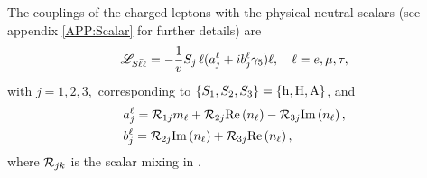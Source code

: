 \documentclass[12pt,a4paper]{article}
\begin{document}
The couplings of the charged leptons with the physical neutral scalars (see appendix \ref{APP:Scalar} for further details) are
\begin{equation}\label{eq:Sll:couplings:00}
 \mathscr L_{S\bar{\ell}\ell}=-\frac{1}{v_{}}S_j\,\bar \ell(a_j^\ell+ib_j^\ell\gamma_5)\ell,\quad \ell=e,\mu,\tau,
\end{equation}
with $j=1,2,3,$ corresponding to $\{S_1,S_2,S_3\}=\{{\rm h},{\rm H},{\rm A}\}$, and
\begin{equation}\label{eq:Sll:couplings:01}
 \begin{aligned}
& a_j^\ell=\mathcal R_{1j}m_\ell+\mathcal R_{2j}\text{Re}\left(n_\ell\right)-\mathcal R_{3j}\text{Im}\left(n_\ell\right),\\
& b_j^\ell=\mathcal R_{2j}\text{Im}\left(n_\ell\right)+\mathcal R_{3j}\text{Re}\left(n_\ell\right),
 \end{aligned}
\end{equation}
where $\mathcal R_{jk}$ is the scalar mixing in .
\end{document}
